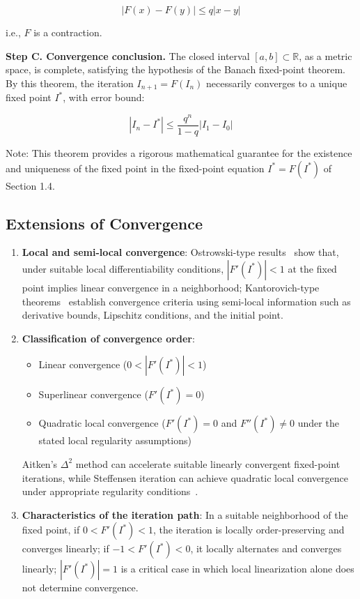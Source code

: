 \documentclass[11pt,a4paper]{amsart}
\begin{document}
\begin{equation}
|F(x) - F(y)| \le q |x - y|
\end{equation}

i.e., $F$ is a contraction.

\textbf{Step C. Convergence conclusion.} The closed interval $[a,b] \subset \mathbb{R}$, as a metric space, is complete, satisfying the hypothesis of the Banach fixed-point theorem. By this theorem, the iteration $I_{n+1} = F(I_n)$ necessarily converges to a unique fixed point $I^*$, with error bound:

\begin{equation}
\label{eq:error-bound}
|I_n - I^*| \le \frac{q^n}{1-q} |I_1 - I_0|
\end{equation}

Note: This theorem provides a rigorous mathematical guarantee for the existence and uniqueness of the fixed point in the fixed-point equation $I^* = F(I^*)$ of Section 1.4.

\subsection{Extensions of Convergence}

\begin{enumerate}
\item \textbf{Local and semi-local convergence}: Ostrowski-type results~\cite{ostrowski1973} show that, under suitable local differentiability conditions, $|F'(I^*)| < 1$ at the fixed point implies linear convergence in a neighborhood; Kantorovich-type theorems~\cite{kantorovich1982} establish convergence criteria using semi-local information such as derivative bounds, Lipschitz conditions, and the initial point.
\item \textbf{Classification of convergence order}:
\begin{itemize}
\item Linear convergence ($0 < |F'(I^*)| < 1$)
\item Superlinear convergence ($F'(I^*) = 0$)
\item Quadratic local convergence ($F'(I^*) = 0$ and $F''(I^*) \ne 0$ under the stated local regularity assumptions)
\end{itemize}

Aitken's $\Delta^2$ method can accelerate suitable linearly convergent fixed-point iterations, while Steffensen iteration can achieve quadratic local convergence under appropriate regularity conditions~\cite{berinde2007}.

\item \textbf{Characteristics of the iteration path}: In a suitable neighborhood of the fixed point, if $0 < F'(I^*) < 1$, the iteration is locally order-preserving and converges linearly; if $-1 < F'(I^*) < 0$, it locally alternates and converges linearly; $|F'(I^*)| = 1$ is a critical case in which local linearization alone does not determine convergence.
\end{enumerate}
\end{document}
